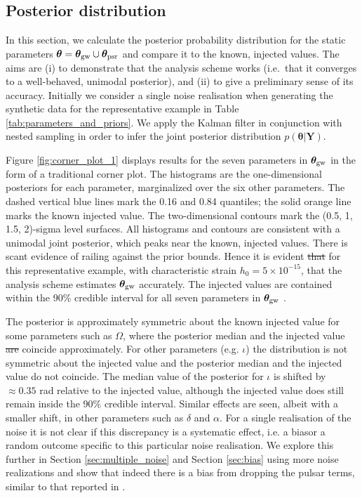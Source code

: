 \documentclass[fleqn,usenatbib,useAMS]{mnras}
\providecommand{\DIFadd}[1]{{\protect\color{blue}\uwave{#1}}} %
\providecommand{\DIFdel}[1]{{\protect\color{red}\sout{#1}}}                      %
\providecommand{\DIFaddbegin}{} %
\providecommand{\DIFaddend}{} %
\providecommand{\DIFdelbegin}{} %
\providecommand{\DIFdelend}{} %
\newcommand{\DIFscaledelfig}{0.5}
\newlength{\DIFdelgraphicswidth} %
\newlength{\DIFdelgraphicsheight} %
\newcommand{\DIFaddincludegraphics}[2][]{{\color{blue}\fbox{\DIFOincludegraphics[#1]{#2}}}} %
\newcommand{\DIFdelincludegraphics}[2][]{%
\sbox{\DIFdelgraphicsbox}{\DIFOincludegraphics[#1]{#2}}%
\settoboxwidth{\DIFdelgraphicswidth}{\DIFdelgraphicsbox} %
\settoboxtotalheight{\DIFdelgraphicsheight}{\DIFdelgraphicsbox} %
\scalebox{\DIFscaledelfig}{%
\parbox[b]{\DIFdelgraphicswidth}{\usebox{\DIFdelgraphicsbox}\\[-\baselineskip] \rule{\DIFdelgraphicswidth}{0em}}\llap{\resizebox{\DIFdelgraphicswidth}{\DIFdelgraphicsheight}{%
\setlength{\unitlength}{\DIFdelgraphicswidth}%
\begin{picture}(1,1)%
\thicklines\linethickness{2pt} %
{\color[rgb]{1,0,0}\put(0,0){\framebox(1,1){}}}%
{\color[rgb]{1,0,0}\put(0,0){\line( 1,1){1}}}%
{\color[rgb]{1,0,0}\put(0,1){\line(1,-1){1}}}%
\end{picture}%
}\hspace*{3pt}}} %
} %
\DeclareRobustCommand{\DIFaddbegin}{\DIFOaddbegin \let\includegraphics\DIFaddincludegraphics} %
\DeclareRobustCommand{\DIFaddend}{\DIFOaddend \let\includegraphics\DIFOincludegraphics} %
\DeclareRobustCommand{\DIFdelbegin}{\DIFOdelbegin \let\includegraphics\DIFdelincludegraphics} %
\DeclareRobustCommand{\DIFdelend}{\DIFOaddend \let\includegraphics\DIFOincludegraphics} %
\begin{document}
	
	\subsection{Posterior distribution}\label{sec:parameter_estim}
	In this section, we calculate the posterior probability distribution for the static parameters $\boldsymbol{\theta} = \boldsymbol{\theta}_{\rm gw} \cup \boldsymbol{\theta}_{\rm psr}$ and compare it to the known, injected values. The aims are (i) to demonstrate that the analysis scheme works (i.e.\ that it converges to a well-behaved, unimodal posterior), and (ii) to give a preliminary sense of its accuracy. Initially we consider a single noise realisation when generating the synthetic data for the representative example in Table \ref{tab:parameters_and_priors}. We apply the Kalman filter in conjunction with nested sampling in order to infer the joint posterior distribution $p({\boldsymbol{\theta}} | {\boldsymbol{Y}})$. \newline 

Figure \ref{fig:corner_plot_1} displays results for the seven parameters in  $\boldsymbol{\theta}_{\rm gw}$ in the form of a traditional corner plot. The histograms are the one-dimensional posteriors for each parameter, marginalized over the six other parameters. The dashed vertical blue lines mark the 0.16 and 0.84 quantiles; the solid orange line marks the known injected value. The two-dimensional contours mark the (0.5, 1, 1.5, 2)-sigma level surfaces. All histograms and contours are consistent with a unimodal joint posterior, which peaks near the known, injected values. There is scant evidence of railing against the prior bounds. Hence it is evident \DIFdelbegin \DIFdel{that }\DIFdelend for this representative example, with characteristic strain $h_0 = 5 \times 10^{-15}$, that the analysis scheme estimates $\boldsymbol{\theta}_{\rm gw}$ accurately. The injected values are contained within the 90\% credible interval for all seven parameters in $\boldsymbol{\theta}_{\rm gw}$ . \newline 

 
The posterior is approximately symmetric about the known injected value for some parameters such as $\Omega$, where the posterior median and the injected value \DIFdelbegin \DIFdel{are }\DIFdelend coincide approximately. For other parameters (e.g. $\iota$) the distribution is not symmetric about the injected value and the posterior median and the injected value do not coincide. The median value of the posterior for $\iota$ is shifted by $\approx 0.35$ rad relative to the injected value, although the injected value does still remain inside the 90\% credible interval. Similar effects are seen, albeit with a smaller shift, in other parameters such as $\delta$ and $\alpha$. For a single realisation of the noise it is not clear if this discrepancy is a systematic effect, i.e. a bias\DIFaddbegin \DIFadd{, }\DIFaddend or a random outcome specific to this particular noise realisation. We explore this further in Section \ref{sec:multiple_noise} and Section \ref{sec:bias} using more noise realizations and show that indeed there is a \DIFaddbegin \DIFadd{systematic }\DIFaddend bias from dropping the pulsar terms, similar to that reported in \cite{Zhupulsarterms}. \newline 
\end{document}
